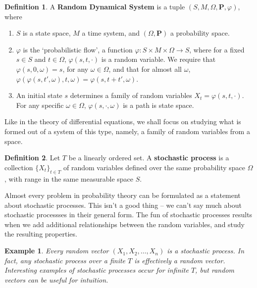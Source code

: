 \documentclass[12pt]{report}
\theoremstyle{plain}
\newtheorem*{example}{Example}
\theoremstyle{definition}
\newtheorem*{defi}{Definition}
\newenvironment{definition}
    {\begin{samepage}\begin{framed}\begin{defi}}
    {\end{defi}\end{framed}\end{samepage}}
\begin{document}
\begin{definition}
    A {\bf Random Dynamical System} is a tuple $(S, M, \Omega, \mathbf{P},\varphi)$, where
    \begin{enumerate}
        \item $S$ is a state space, $M$ a time system, and $(\Omega, \mathbf{P})$ a probability space.
        \item $\varphi$ is the `probabilistic flow', a function $\varphi:S \times M \times \Omega \to S$, where for a fixed $s \in S$ and $t \in \Omega$, $\varphi(s,t,\cdot)$ is a random variable. We require that $\varphi(s,0,\omega) = s$, for any $\omega \in \Omega$, and that for almost all $\omega$, $\varphi(\varphi(s,t',\omega),t,\omega) = \varphi(s,t + t', \omega)$.
        \item An initial state $s$ determines a family of random variables $X_t = \varphi(s,t,\cdot)$. For any specific $\omega \in \Omega$, $\varphi(s,\cdot,\omega)$ is a path is state space.
    \end{enumerate}
\end{definition}

Like in the theory of differential equations, we shall focus on studying what is formed out of a system of this type, namely, a family of random variables from a space.

\begin{definition}
    Let $T$ be a linearly ordered set. A {\bf stochastic process} is a collection $\{ X_t \}_{t \in T}$ of random variables defined over the same probability space $\Omega$, with range in the same measurable space $S$.
\end{definition}

Almost every problem in probability theory can be formulated as a statement about stochastic processes. This isn't a good thing -- we can't say much about stochastic processses in their general form. The fun of stochastic processes results when we add additional relationships between the random variables, and study the resulting properties.

\begin{example}
    Every random vector $(X_1, X_2, \dots, X_n)$ is a stochastic process. In fact, any stochastic process over a finite $T$ is effectively a random vector. Interesting examples of stochastic processes occur for infinite $T$, but random vectors can be useful for intuition.
\end{example}
\end{document}
